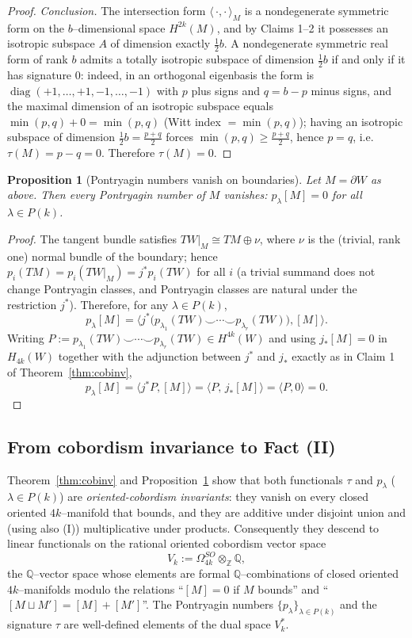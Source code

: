 \documentclass[12pt]{article}
\newtheorem{proposition}{Proposition}
\theoremstyle{definition}
\begin{document}
\begin{proof}
\noindent\emph{Conclusion.}  The intersection form $\langle\,\cdot,\cdot\,\rangle_M$ is a
nondegenerate symmetric form on the $b$--dimensional space $H^{2k}(M)$, and by Claims 1--2
it possesses an isotropic subspace $A$ of dimension exactly $\tfrac12 b$.  A
nondegenerate symmetric real form of rank $b$ admits a totally isotropic subspace of
dimension $\tfrac12 b$ if and only if it has signature $0$: indeed, in an orthogonal
eigenbasis the form is $\operatorname{diag}(+1,\dots,+1,-1,\dots,-1)$ with $p$ plus signs
and $q=b-p$ minus signs, and the maximal dimension of an isotropic subspace equals
$\min(p,q)+0=\min(p,q)$ \big(Witt index $=\min(p,q)$\big); having an isotropic subspace of
dimension $\tfrac12 b=\tfrac{p+q}2$ forces $\min(p,q)\ge\tfrac{p+q}2$, hence $p=q$, i.e.\
$\tau(M)=p-q=0$.  Therefore $\tau(M)=0$.
\end{proof}

\begin{proposition}[Pontryagin numbers vanish on boundaries]\label{prop:pnbdy}
Let $M=\partial W$ as above.  Then every Pontryagin number of $M$ vanishes:
$p_\lambda[M]=0$ for all $\lambda\in P(k)$.
\end{proposition}

\begin{proof}
The tangent bundle satisfies $TW|_M\cong TM\oplus\nu$, where $\nu$ is the (trivial, rank
one) normal bundle of the boundary; hence $p_i(TM)=p_i(TW|_M)=j^\ast p_i(TW)$ for all $i$
(a trivial summand does not change Pontryagin classes, and Pontryagin classes are natural
under the restriction $j^\ast$).  Therefore, for any $\lambda\in P(k)$,
\[
p_\lambda[M]=\big\langle j^\ast\!\big(p_{\lambda_1}(TW)\smile\cdots\smile
p_{\lambda_r}(TW)\big),[M]\big\rangle .
\]
Writing $P:=p_{\lambda_1}(TW)\smile\cdots\smile p_{\lambda_r}(TW)\in H^{4k}(W)$ and using
$j_\ast[M]=0$ in $H_{4k}(W)$ together with the adjunction between $j^\ast$ and $j_\ast$
exactly as in Claim 1 of Theorem~\ref{thm:cobinv},
\[
p_\lambda[M]=\big\langle j^\ast P,[M]\big\rangle
=\big\langle P,\,j_\ast[M]\big\rangle=\big\langle P,0\big\rangle=0 .
\]
\end{proof}

\subsection*{From cobordism invariance to Fact (II)}

Theorem~\ref{thm:cobinv} and Proposition~\ref{prop:pnbdy} show that both functionals
$\tau$ and $p_\lambda$ ($\lambda\in P(k)$) are \emph{oriented-cobordism invariants}: they
vanish on every closed oriented $4k$--manifold that bounds, and they are additive under
disjoint union and (using also (I)) multiplicative under products.  Consequently they
descend to linear functionals on the rational oriented cobordism vector space
\[
V_k:=\Omega^{SO}_{4k}\otimes_{\mathbb Z}\mathbb Q ,
\]
the $\mathbb Q$--vector space whose elements are formal $\mathbb Q$--combinations of
closed oriented $4k$--manifolds modulo the relations ``$[M]=0$ if $M$ bounds'' and
``$[M\sqcup M']=[M]+[M']$''.  The Pontryagin numbers $\{p_\lambda\}_{\lambda\in P(k)}$ and
the signature $\tau$ are well-defined elements of the dual space $V_k^\ast$.
\end{document}
